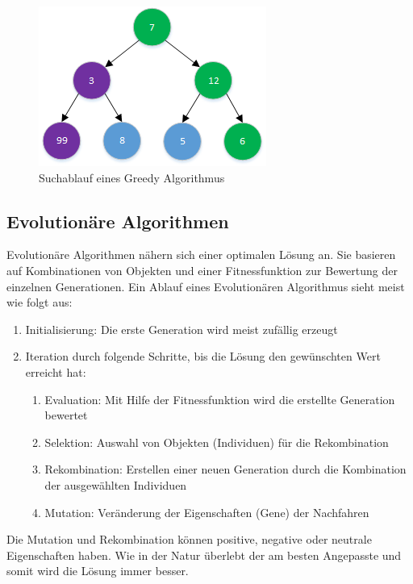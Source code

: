 \begin{figure}[h]
\centering 
\includegraphics[scale=1]{images/einleitung/greedy_algo.png}
\caption[Suchablauf eines Greedy Algorithmus]{Suchablauf eines Greedy Algorithmus }
\label{fig:greedy_algo}
\end{figure}

\FloatBarrier

\subsection{Evolutionäre Algorithmen}\label{ea_algos}
Evolutionäre Algorithmen nähern sich einer optimalen Lösung an. Sie basieren auf Kombinationen von Objekten und einer Fitnessfunktion zur Bewertung der einzelnen Generationen. 
Ein Ablauf eines Evolutionären Algorithmus sieht meist wie folgt aus:
\begin{enumerate}
	\item Initialisierung: Die erste Generation wird meist zufällig erzeugt
	\item Iteration durch folgende Schritte, bis die Lösung den gewünschten Wert erreicht hat:
     	\begin{enumerate}
		\item Evaluation: Mit Hilfe der Fitnessfunktion wird die erstellte Generation bewertet
         		\item Selektion: Auswahl von Objekten (Individuen) für die Rekombination
         		\item Rekombination: Erstellen einer neuen Generation durch die Kombination der ausgewählten Individuen
         		\item Mutation: Veränderung der Eigenschaften (Gene) der Nachfahren
      	\end{enumerate}
\end{enumerate}
Die Mutation und Rekombination können positive, negative oder neutrale Eigenschaften haben. Wie in der Natur überlebt der am besten Angepasste und somit wird die Lösung immer besser.
